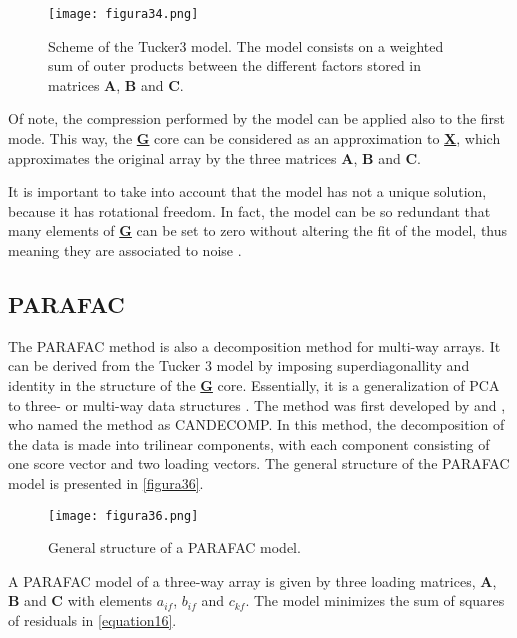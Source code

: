 \begin{figure}[hbtp]
\centering
\texttt{[image: figura34.png]}
\caption[Scheme of the Tucker3 model]{Scheme of the Tucker3 model. The model consists on a weighted sum of outer products between the different factors stored in matrices \textbf{A}, \textbf{B} and \textbf{C}.}
\label{figura34}
\end{figure}

Of note, the compression performed by the model can be applied also to the first mode. This way, the \textbf{\underline{G}} core can be considered as an approximation to \textbf{\underline{X}}, which approximates the original array by the three matrices \textbf{A}, \textbf{B} and \textbf{C}.

It is important to take into account that the model has not a unique solution, because it has rotational freedom. In fact, the model can be so redundant that many elements of \textbf{\underline{G}} can be set to zero without altering the fit of the model, thus meaning they are associated to noise \parencite{montalban2005control}.

\subsection{PARAFAC}
The PARAFAC method is also a decomposition method for multi-way arrays. It can be derived from the Tucker 3 model by imposing superdiagonallity and identity in the structure of the \textbf{\underline{G}} core. Essentially, it is a generalization of PCA to three- or multi-way data structures \parencite{bro1997parafac}. The method was first developed by \textcite{harshman1970foundations} and \textcite{carroll1970analysis}, who named the method as CANDECOMP. In this method, the decomposition of the data is made into trilinear components, with each component consisting of one score vector and two loading vectors. The general structure of the PARAFAC model is presented in \autoref{figura36}.

\begin{figure}[hbtp]
\centering
\texttt{[image: figura36.png]}
\caption{General structure of a PARAFAC model.}
\label{figura36}
\end{figure}

A PARAFAC model of a three-way array is given by three loading matrices, \textbf{A}, \textbf{B} and \textbf{C} with elements $a_{if}$, $b_{if}$ and $c_{kf}$. The model minimizes the sum of squares of residuals in \autoref{equation16}.

